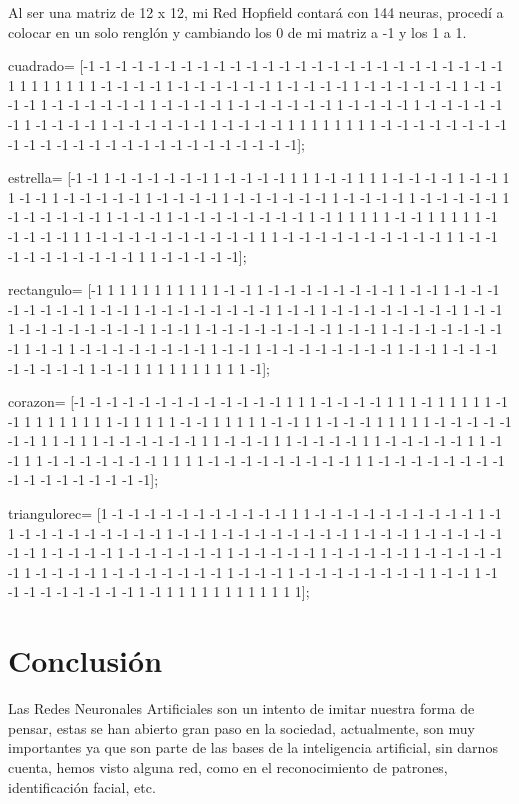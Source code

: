 \documentclass[12pt]{article}
\begin{document}
Al ser una matriz de 12 x 12, mi Red Hopfield contará con 144 neuras, procedí a colocar en un solo renglón y cambiando los 0 de mi matriz a -1 y los 1 a 1. 

cuadrado= [-1 -1 -1 -1 -1 -1 -1 -1 -1 -1 -1 -1 -1 -1 -1 -1 -1 -1 -1 -1 -1 -1 -1 -1 -1 -1 1 1 1 1 1 1 1 1 -1 -1 -1 -1 1 -1 -1 -1 -1 -1 -1 1 -1 -1 -1 -1 1 -1 -1 -1 -1 -1 -1 1 -1 -1 -1 -1 1 -1 -1 -1 -1 -1 -1 1 -1 -1 -1 -1 1 -1 -1 -1 -1 -1 -1 1 -1 -1 -1 -1 1 -1 -1 -1 -1 -1 -1 1 -1 -1 -1 -1 1 -1 -1 -1 -1 -1 -1 1 -1 -1 -1 -1 1 1 1 1 1 1 1 1 -1 -1 -1 -1 -1 -1 -1 -1 -1 -1 -1 -1 -1 -1 -1 -1 -1 -1 -1 -1 -1 -1 -1 -1 -1 -1];
           
estrella= [-1 -1 1 -1 -1 -1 -1 -1 -1 1 -1 -1 -1 -1 1 1 1 -1 -1 1 1 1 -1 -1 -1 -1 1 -1 -1 1 1 -1 -1 1 -1 -1 -1 -1 -1 1 -1 -1 -1 -1 1 -1 -1 -1 -1 -1 -1 1 -1 -1 -1 -1 1 -1 -1 -1 -1 -1 1 -1 -1 -1 -1 -1 -1 1 -1 -1 -1 1 -1 -1 -1 -1 -1 -1 -1 -1 1 -1 1 1 1 1 1 -1 -1 1 1 1 1 1 -1 -1 -1 -1 -1 1 1 -1 -1 -1 -1 -1 -1 -1 -1 -1 -1 1 1 -1 -1 -1 -1 -1 -1 -1 -1 -1 -1 1 1 -1 -1 -1 -1 -1 -1 -1 -1 -1 -1 1 1 -1 -1 -1 -1 -1];
                     
rectangulo= [-1 1 1 1 1 1 1 1 1 1 1 -1 -1 1 -1 -1 -1 -1 -1 -1 -1 -1 1 -1 -1 1 -1 -1 -1 -1 -1 -1 -1 -1 1 -1 -1 1 -1 -1 -1 -1 -1 -1 -1 -1 1 -1 -1 1 -1 -1 -1 -1 -1 -1 -1 -1 1 -1 -1 1 -1 -1 -1 -1 -1 -1 -1 -1 1 -1 -1 1 -1 -1 -1 -1 -1 -1 -1 -1 1 -1 -1 1 -1 -1 -1 -1 -1 -1 -1 -1 1 -1 -1 1 -1 -1 -1 -1 -1 -1 -1 -1 1 -1 -1 1 -1 -1 -1 -1 -1 -1 -1 -1 1 -1 -1 1 -1 -1 -1 -1 -1 -1 -1 -1 1 -1 -1 1 1 1 1 1 1 1 1 1 1 -1];
  
corazon= [-1 -1 -1 -1 -1 -1 -1 -1 -1 -1 -1 -1 -1 1 1 1 -1 -1 -1 -1 1 1 1 -1 1 1 1 1 1 -1 -1 1 1 1 1 1 1 1 1 -1 1 1 1 1 -1 -1 1 1 1 1 1 -1 -1 1 1 -1 -1 -1 1 1 1 1 1 -1 -1 -1 -1 -1 -1 -1 1 1 -1 1 1 -1 -1 -1 -1 -1 -1 1 1 -1 -1 -1 1 1 -1 -1 -1 -1 1 1 -1 -1 -1 -1 -1 1 1 -1 -1 1 1 -1 -1 -1 -1 -1 -1 -1 1 1 1 1 -1 -1 -1 -1 -1 -1 -1 -1 -1 1 1 -1 -1 -1 -1 -1 -1 -1 -1 -1 -1 -1 -1 -1 -1 -1 -1 -1];
                     
triangulorec= [1 -1 -1 -1 -1 -1 -1 -1 -1 -1 -1 -1 1 1 -1 -1 -1 -1 -1 -1 -1 -1 -1 -1 1 -1 1 -1 -1 -1 -1 -1 -1 -1 -1 -1 1 -1 -1 1 -1 -1 -1 -1 -1 -1 -1 -1 1 -1 -1 -1 1 -1 -1 -1 -1 -1 -1 -1 1 -1 -1 -1 -1 1 -1 -1 -1 -1 -1 -1 1 -1 -1 -1 -1 -1 1 -1 -1 -1 -1 -1 1 -1 -1 -1 -1 -1 -1 1 -1 -1 -1 -1 1 -1 -1 -1 -1 -1 -1 -1 1 -1 -1 -1 1 -1 -1 -1 -1 -1 -1 -1 -1 1 -1 -1 1 -1 -1 -1 -1 -1 -1 -1 -1 -1 1 -1 1 1 1 1 1 1 1 1 1 1 1 1];
               

\section{Conclusión}
Las Redes Neuronales Artificiales son un intento de imitar nuestra forma de pensar, estas se han abierto gran paso en la sociedad, actualmente, son muy importantes ya que son parte de las bases de la inteligencia artificial, sin darnos cuenta, hemos visto alguna red, como en el reconocimiento de patrones, identificación facial, etc. 
\end{document}
